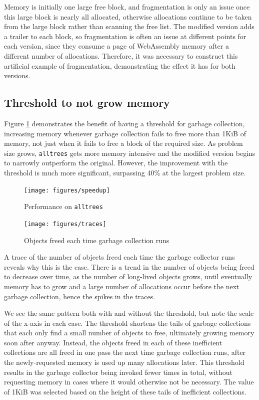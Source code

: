 Memory is initially one large free block, and fragmentation is only an issue once this large block is nearly all allocated, otherwise allocations continue to be taken from the large block rather than scanning the free list. The modified version adds a trailer to each block, so fragmentation is often an issue at different points for each version, since they consume a page of WebAssembly memory after a different number of allocations. Therefore, it was necessary to construct this artificial example of fragmentation, demonstrating the effect it has for both versions.

\subsection{Threshold to not grow memory}

Figure \ref{fig:speedup} demonstrates the benefit of having a threshold for garbage collection, increasing memory whenever garbage collection fails to free more than 1KiB of memory, not just when it fails to free a block of the required size. As problem size grows, \verb|alltrees| gets more memory intensive and the modified version begins to narrowly outperform the original. However, the improvement with the threshold is much more significant, surpassing 40\% at the largest problem size.

\begin{figure}[H]
\hfill \texttt{[image: figures/speedup]} \hfill
\vspace{-0.2cm}
\cprotect\caption{Performance on \verb|alltrees|}
 \label{fig:speedup} 
\end{figure}


\begin{figure}[H]
\hfill \texttt{[image: figures/traces]} \hfill
\vspace{-0.8cm}
\caption{Objects freed each time garbage collection runs}
 \label{fig:traces} 
\end{figure}
A trace of the number of objects freed each time the garbage collector runs reveals why this is the case. There is a trend in the number of objects being freed to decrease over time, as the number of long-lived objects grows, until eventually memory has to grow and a large number of allocations occur before the next garbage collection, hence the spikes in the traces. 

We see the same pattern both with and without the threshold, but note the scale of the x-axis in each case. The threshold shortens the tails of garbage collections that each only find a small number of objects to free, ultimately growing memory soon after anyway. Instead, the objects freed in each of these inefficient collections are all freed in one pass the next time garbage collection runs, after the newly-requested memory is used up many allocations later. This threshold results in the garbage collector being invoked fewer times in total, without requesting memory in cases where it would otherwise not be necessary. The value of 1KiB was selected based on the height of these tails of inefficient collections.

